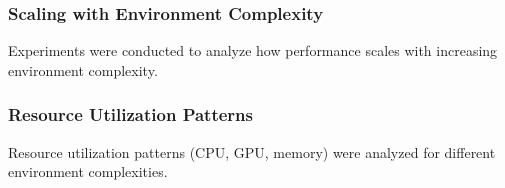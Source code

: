 \subsubsection{Scaling with Environment Complexity}
Experiments were conducted to analyze how performance scales with increasing environment complexity.

\subsubsection{Resource Utilization Patterns}
Resource utilization patterns (CPU, GPU, memory) were analyzed for different environment complexities.

